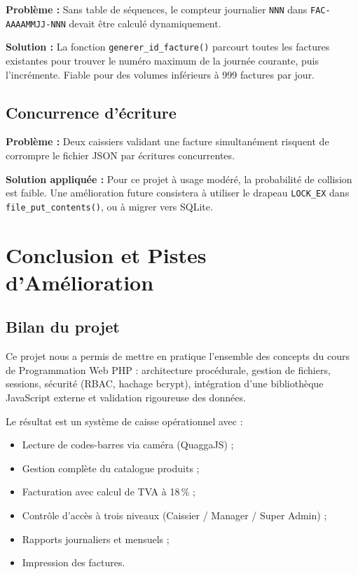 \documentclass[12pt,a4paper]{report}
\begin{document}
\textbf{Problème :} Sans table de séquences, le compteur journalier \texttt{NNN}
dans \texttt{FAC-AAAAMMJJ-NNN} devait être calculé dynamiquement.

\textbf{Solution :} La fonction \texttt{generer\_id\_facture()} parcourt toutes
les factures existantes pour trouver le numéro maximum de la journée courante,
puis l'incrémente. Fiable pour des volumes inférieurs à 999 factures par jour.

\section{Concurrence d'écriture}

\textbf{Problème :} Deux caissiers validant une facture simultanément risquent de
corrompre le fichier JSON par écritures concurrentes.

\textbf{Solution appliquée :} Pour ce projet à usage modéré, la probabilité de
collision est faible. Une amélioration future consistera à utiliser le drapeau
\texttt{LOCK\_EX} dans \texttt{file\_put\_contents()}, ou à migrer vers SQLite.

\chapter{Conclusion et Pistes d'Amélioration}

\section{Bilan du projet}

Ce projet nous a permis de mettre en pratique l'ensemble des concepts du cours de
Programmation Web PHP : architecture procédurale, gestion de fichiers, sessions,
sécurité (RBAC, hachage bcrypt), intégration d'une bibliothèque JavaScript externe
et validation rigoureuse des données.

Le résultat est un système de caisse opérationnel avec :
\begin{itemize}
  \item Lecture de codes-barres via caméra (QuaggaJS) ;
  \item Gestion complète du catalogue produits ;
  \item Facturation avec calcul de TVA à 18\,\% ;
  \item Contrôle d'accès à trois niveaux (Caissier / Manager / Super Admin) ;
  \item Rapports journaliers et mensuels ;
  \item Impression des factures.
\end{itemize}
\end{document}
